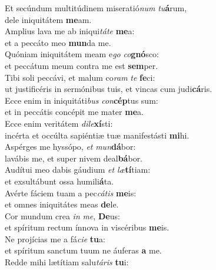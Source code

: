 \evenverse Et secúndum multitúdinem miseratió\textit{num} \textit{tu}\textbf{á}rum,~\*\\
\evenverse dele iniquitátem \textbf{me}am.\\
\oddverse Amplius lava me ab iniqui\textit{tá}\textit{te} \textbf{me}a:~\*\\
\oddverse et a peccáto meo \textbf{mun}da me.\\
\evenverse Quóniam iniquitátem meam e\textit{go} \textit{co}\textbf{gnó}sco:~\*\\
\evenverse et peccátum meum contra me est \textbf{sem}per.\\
\oddverse Tibi soli peccávi, et malum co\textit{ram} \textit{te} \textbf{fe}ci:~\*\\
\oddverse ut justificéris in sermónibus tuis, et vincas cum judi\textbf{cá}ris.\\
\evenverse Ecce enim in iniquitáti\textit{bus} \textit{con}\textbf{cép}tus sum:~\*\\
\evenverse et in peccátis concépit me mater \textbf{me}a.\\
\oddverse Ecce enim veritátem \textit{di}\textit{le}\textbf{xí}sti:~\*\\
\oddverse incérta et occúlta sapiéntiæ tuæ manifestásti \textbf{mi}hi.\\
\evenverse Aspérges me hyssópo, \textit{et} \textit{mun}\textbf{dá}bor:~\*\\
\evenverse lavábis me, et super nivem deal\textbf{bá}bor.\\
\oddverse Audítui meo dabis gáudium \textit{et} \textit{læ}\textbf{tí}tiam:~\*\\
\oddverse et exsultábunt ossa humili\textbf{á}ta.\\
\evenverse Avérte fáciem tuam a pec\textit{cá}\textit{tis} \textbf{me}is:~\*\\
\evenverse et omnes iniquitátes meas \textbf{de}le.\\
\oddverse Cor mundum crea \textit{in} \textit{me}, \textbf{De}us:~\*\\
\oddverse et spíritum rectum ínnova in viscéribus \textbf{me}is.\\
\evenverse Ne projícias me a fá\textit{ci}\textit{e} \textbf{tu}a:~\*\\
\evenverse et spíritum sanctum tuum ne áuferas \textbf{a} me.\\
\oddverse Redde mihi lætítiam salu\textit{tá}\textit{ris} \textbf{tu}i:~\*\\
